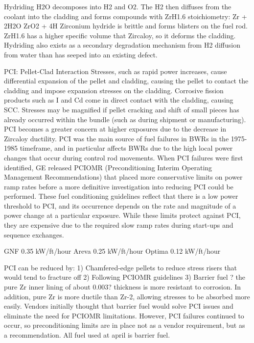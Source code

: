 \documentclass[10pt]{article}
\begin{document}
Hydriding
H2O decomposes into H2 and O2. The H2 then diffuses from the coolant into the cladding and forms compounds with ZrH1.6 stoichiometry:
Zr + 2H2O  ZrO2 + 4H
 Zirconium hydride is brittle and forms blisters on the fuel rod. ZrH1.6 has a higher specific volume that Zircaloy, so it deforms the cladding. Hydriding also exists as a secondary degradation mechanism from H2 diffusion from water than has seeped into an existing defect. 

PCI: Pellet-Clad Interaction
Stresses, such as rapid power increases, cause differential expansion of the pellet and cladding, causing the pellet to contact the cladding and impose expansion stresses on the cladding. Corrosive fission products such as I and Cd come in direct contact with the cladding, causing SCC. Stresses may be magnified if pellet cracking and shift of small pieces has already occurred within the bundle (such as during shipment or manufacturing). PCI becomes a greater concern at higher exposures due to the decrease in Zircaloy ductility. PCI was the main source of fuel failures in BWRs in the 1975-1985 timeframe, and in particular affects BWRs due to the high local power changes that occur during control rod movements. When PCI failures were first identified, GE released PCIOMR (Preconditioning Interim Operating Management Recommendations) that placed more conservative limits on power ramp rates before a more definitive investigation into reducing PCI could be performed. These fuel conditioning guidelines reflect that there is a low power threshold to PCI, and its occurrence depends on the rate and magnitude of a power change at a particular exposure. While these limits protect against PCI, they are expensive due to the required slow ramp rates during start-ups and sequence exchanges. 

GNF
0.35 kW/ft/hour
Areva
0.25 kW/ft/hour
Optima
0.12 kW/ft/hour

PCI can be reduced by:
1)	Chamfered-edge pellets to reduce stress risers that would tend to fracture off
2)	Following PCIOMR guidelines
3)	Barrier fuel ? the pure Zr inner lining of about 0.003? thickness is more resistant to corrosion. In addition, pure Zr is more ductile than Zr-2, allowing stresses to be absorbed more easily. Vendors initially thought that barrier fuel would solve PCI issues and eliminate the need for PCIOMR limitations. However, PCI failures continued to occur, so preconditioning limits are in place not as a vendor requirement, but as a recommendation. All fuel used at april is barrier fuel. 
\end{document}

